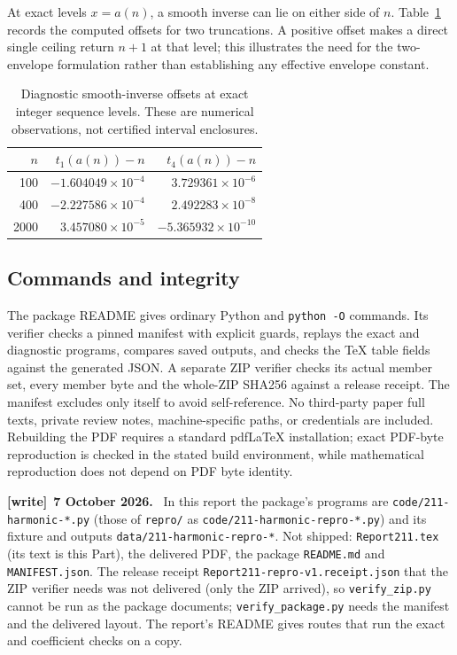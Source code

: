 \documentclass[11pt]{article}
\theoremstyle{definition}\newtheorem{definition}[theorem]{Definition}
\theoremstyle{remark}\newtheorem{remark}[theorem]{Remark}
\newcommand{\file}[1]{\nolinkurl{#1}}
\newenvironment{writenote}[1][]{\par\smallskip\begingroup\small
 \noindent\textbf{[write]}\if\relax\detokenize{#1}\relax\else~\textbf{#1.}\fi\ }%
 {\par\endgroup\smallskip}
\begin{document}
At exact levels $x=a(n)$, a smooth inverse can lie on either side of
$n$. Table~\ref{dep:hl:tab:inverse} records the computed offsets for two
truncations. A positive offset makes a direct single ceiling return
$n+1$ at that level; this illustrates the need for the two-envelope
formulation rather than establishing any effective envelope constant.
\begin{table}[htbp]
\centering
\begin{tabular}{rrr}
\toprule
$n$ & $t_1(a(n))-n$ & $t_4(a(n))-n$ \\
\midrule
100 & $-1.604049\times10^{-4}$ & $3.729361\times10^{-6}$ \\
400 & $-2.227586\times10^{-4}$ & $2.492283\times10^{-8}$ \\
2000 & $3.457080\times10^{-5}$ & $-5.365932\times10^{-10}$ \\
\bottomrule
\end{tabular}
\caption{Diagnostic smooth-inverse offsets at exact integer sequence levels. These are numerical observations, not certified interval enclosures.}
\label{dep:hl:tab:inverse}
\end{table}

\subsection{Commands and integrity}
The package README gives ordinary Python and \texttt{python -O}
commands. Its verifier checks a pinned manifest with explicit guards,
replays the exact and diagnostic programs, compares saved outputs,
and checks the TeX table fields against the generated JSON. A separate
ZIP verifier checks its actual member set, every member byte and the
whole-ZIP SHA256 against a release receipt. The manifest excludes only
itself to avoid self-reference. No third-party paper full texts,
private review notes, machine-specific paths, or credentials are
included. Rebuilding the PDF requires a standard pdfLaTeX installation;
exact PDF-byte reproduction is checked in the stated build environment,
while mathematical reproduction does not depend on PDF byte identity.

\begin{writenote}[7 October 2026]
In this report the package's programs are \file{code/211-harmonic-*.py} (those of \file{repro/} as \file{code/211-harmonic-repro-*.py}) and its fixture and outputs \file{data/211-harmonic-repro-*}. Not shipped: \file{Report211.tex} (its text is this Part), the delivered PDF, the package \file{README.md} and \file{MANIFEST.json}. The release receipt \file{Report211-repro-v1.receipt.json} that the ZIP verifier needs was not delivered (only the ZIP arrived), so \file{verify_zip.py} cannot be run as the package documents; \file{verify_package.py} needs the manifest and the delivered layout. The report's README gives routes that run the exact and coefficient checks on a copy.
\end{writenote}
\end{document}
